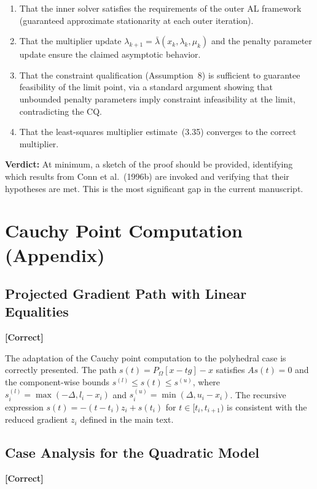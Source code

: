 \documentclass[11pt]{article}
\newcommand{\proj}[2]{P_{#1}\!\left[#2\right]}
\newcommand{\verdict}[1]{\par\medskip\noindent\textbf{Verdict:} #1\par\medskip}
\newcommand{\statusok}{\textcolor{okcolor}{\textbf{[Correct]}}}
\theoremstyle{plain}
\begin{document}
\begin{enumerate}[label=(\roman*)]
  \item That the inner solver satisfies the requirements of the outer AL framework (guaranteed approximate stationarity at each outer iteration).
  \item That the multiplier update $\lambda_{k+1} = \bar{\lambda}(x_k,\lambda_k,\mu_k)$ and the penalty parameter update ensure the claimed asymptotic behavior.
  \item That the constraint qualification (Assumption~8) is sufficient to guarantee feasibility of the limit point, via a standard argument showing that unbounded penalty parameters imply constraint infeasibility at the limit, contradicting the CQ.
  \item That the least-squares multiplier estimate~(3.35) converges to the correct multiplier.
\end{enumerate}

\verdict{At minimum, a sketch of the proof should be provided, identifying which results from Conn et al.\ (1996b) are invoked and verifying that their hypotheses are met. This is the most significant gap in the current manuscript.}

\section{Cauchy Point Computation (Appendix)}

\subsection{Projected Gradient Path with Linear Equalities}
\statusok

The adaptation of the Cauchy point computation to the polyhedral case is correctly presented. The path $s(t) = \proj{\Omega}{x - tg} - x$ satisfies $As(t) = 0$ and the component-wise bounds $s^{(l)} \le s(t) \le s^{(u)}$, where $s^{(l)}_i = \max(-\Delta, l_i - x_i)$ and $s^{(u)}_i = \min(\Delta, u_i - x_i)$. The recursive expression $s(t) = -(t - t_i)z_i + s(t_i)$ for $t \in [t_i, t_{i+1})$ is consistent with the reduced gradient $z_i$ defined in the main text.

\subsection{Case Analysis for the Quadratic Model}
\statusok
\end{document}
